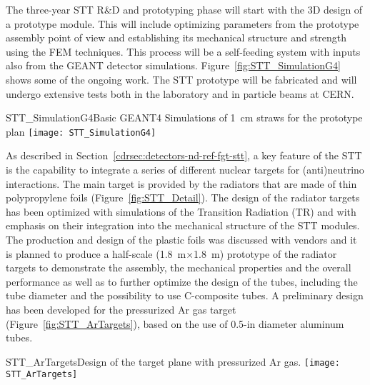The three-year STT R\&D and prototyping phase will start with the 3D
design of a prototype module.  This will include optimizing
parameters from the prototype assembly point of view and
establishing its mechanical structure and strength using the FEM 
techniques. This process will be a self-feeding system with inputs
also from the GEANT detector simulations.
Figure~\ref{fig:STT_SimulationG4} shows some of the ongoing work. 
The STT prototype will be fabricated and  will undergo %
extensive tests both in the laboratory and %
in particle
beams at CERN.

\begin{cdrfigure}
{STT_SimulationG4}{Basic GEANT4 Simulations of 1~cm straws for the prototype plan}
\texttt{[image: STT\_SimulationG4]}
\end{cdrfigure}


As described in Section~\ref{cdrsec:detectors-nd-ref-fgt-stt}, a key
feature of the STT is the capability to integrate a series of
different nuclear targets for (anti)neutrino interactions.  The main
target is provided by the radiators that are made of thin polypropylene foils
(Figure~\ref{fig:STT_Detail}).  The design of the radiator targets has
been optimized with simulations of the Transition Radiation (TR) and
with emphasis on their integration into the mechanical structure of
the STT modules.  The production and design of the plastic foils was
discussed with vendors and %
it is planned to produce a half-scale
(1.8~m$\times$1.8~m) prototype of the radiator targets to demonstrate
the assembly, the mechanical properties and the overall
performance as well as to
further optimize the design of the tubes, including the tube diameter
and the possibility to use C-composite tubes. 
A preliminary design has been developed for the
pressurized Ar gas target (Figure~\ref{fig:STT_ArTargets}), based on
the use of 0.5-in diameter aluminum tubes.
\begin{cdrfigure}
{STT_ArTargets}{Design of the target plane with pressurized Ar gas.}
\texttt{[image: STT\_ArTargets]}
\end{cdrfigure}

